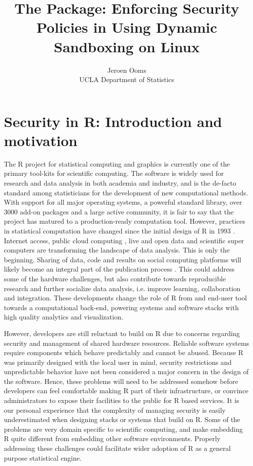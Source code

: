 \documentclass{jss}
\author{Jeroen Ooms\\UCLA Department of Statistics 
}
\title{The \RAppArmor Package: Enforcing Security Policies in \R Using Dynamic
Sandboxing on Linux}
\newcommand{\R}{\textsf{R}\xspace}
\begin{document}
\section[Security in R: Introduction and motivation]{Security in \R:
Introduction and motivation}

The \R project for statistical computing and graphics \citep{R-project} is
currently one of the primary tool-kits for scientific computing. The software
is widely used for research and data analysis in both academia and industry,
and is the de-facto standard among statisticians for the development of new
computational methods. With support for all major operating systems, a powerful
standard library, over 3000 add-on packages and a large active
community, it is fair to say that the project has matured to a production-ready
computation tool. However, practices in statistical computation have changed
since the initial design of \R in 1993 \citep{ihaka1998r}. Internet access,
public cloud computing \citep{armbrust2010view}, live and open data and
scientific super computers are transforming the landscape of data analysis.
This is only the beginning. Sharing of data, code and results on social
computing platforms will likely become an integral part of the publication
process \citep{asareport}. This could address some of the hardware challenges,
but also contribute towards reproducible research and further socialize data
analysis, i.e. improve learning, collaboration and integration. These developments
change the role of \R from and end-user tool towards a computational 
back-end, powering systems and software stacks with high quality analytics and visualization. 

However, developers are still reluctant to build on \R due to concerns
regarding security and management of shared hardware resources. Reliable
software systems require components which behave predictably and cannot be
abused. Because \R was primarily designed with the local user in mind, security
restrictions and unpredictable behavior have not been considered a major
concern in the design of the software. Hence, these problems will need to be
addressed somehow before developers can feel comfortable making \R
part of their infrastructure, or convince administrators to expose their
facilities to the public for \R based services. It is our personal experience
that the complexity of managing security is easily underestimated when designing
stacks or systems that build on \R. Some of the problems are very domain
specific to scientific computing, and make embedding \R quite different
from embedding other software environments. Properly addressing these challenges
could facilitate wider adoption of \R as a general purpose statistical engine.
\end{document}
